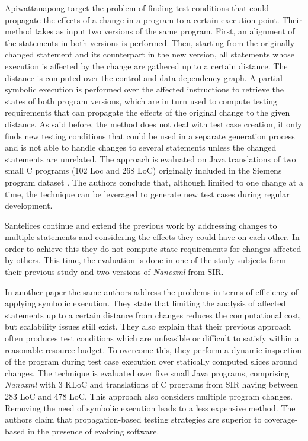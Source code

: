 Apiwattanapong \etal\cite{apiwattanapong2006matrix} target the problem of finding test conditions that could propagate the effects of a change in a program to a certain execution point. 
Their method takes as input two versions of the same program. 
First, an alignment of the statements in both versions is performed. 
Then, starting from the originally changed statement and its counterpart in the new version, all statements whose execution is affected by the change are gathered up to a certain distance. 
The distance is computed over the control and data dependency graph.  
A partial symbolic execution is performed over the affected instructions to retrieve the states of both program versions, which are in turn used to compute testing requirements that can propagate the effects of the original change to the given distance. 
As said before, the method does not deal with test case creation, it only finds new testing conditions that could be used in a separate generation process and is not able to handle changes to several statements unless the changed statements are unrelated. 
The approach is evaluated on Java translations of two small C programs (102 Loc and 268 LoC) originally included in the Siemens program dataset \cite{hutchins1994experiments}. 
The authors conclude that, although limited to one change at a time, the technique can be leveraged to generate new test cases during regular development.

Santelices \etal\cite{santelices2008test} continue and extend the previous work by addressing changes to multiple statements and considering the effects they could have on each other. 
In order to achieve this they do not compute state requirements for changes affected by others. 
This time, the evaluation is done in one of the study subjects form their previous study and two versions of \emph{Nanoxml} from SIR.

In another paper \cite{santelices2011applying} the same authors address the problems in terms of efficiency of applying symbolic execution. 
They state that limiting the analysis of affected statements up to a certain distance from changes reduces the computational cost, but scalability issues still exist. 
They also explain that their previous approach often produces test conditions which are unfeasible or difficult to satisfy within a reasonable resource budget. 
To overcome this, they perform a dynamic inspection of the program during test case execution over statically computed slices around changes. 
The technique is evaluated over five small Java programs, comprising \emph{Nanoxml} with 3 KLoC and translations of C programs from SIR having between 283 LoC and 478 LoC.
This approach also considers multiple program changes. 
Removing the need of symbolic execution leads to a less expensive method. 
The authors claim that propagation-based testing strategies are superior to coverage-based in the presence of evolving software.

